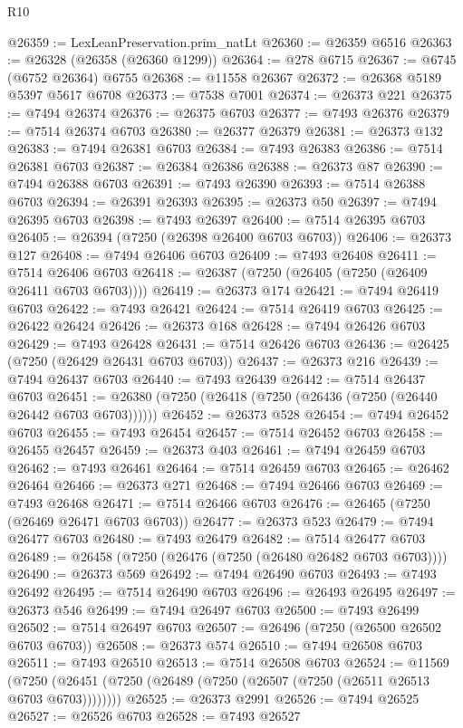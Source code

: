 \begin{lexlean}{R10}
\begin{coremodule}
@26359 := LexLeanPreservation.prim_natLt
@26360 := @26359 @6516
@26363 := @26328 (@26358 (@26360 @1299))
@26364 := @278 @6715
@26367 := @6745 (@6752 @26364) @6755
@26368 := @11558 @26367
@26372 := @26368 @5189 @5397 @5617 @6708
@26373 := @7538 @7001
@26374 := @26373 @221
@26375 := @7494 @26374
@26376 := @26375 @6703
@26377 := @7493 @26376
@26379 := @7514 @26374 @6703
@26380 := @26377 @26379
@26381 := @26373 @132
@26383 := @7494 @26381 @6703
@26384 := @7493 @26383
@26386 := @7514 @26381 @6703
@26387 := @26384 @26386
@26388 := @26373 @87
@26390 := @7494 @26388 @6703
@26391 := @7493 @26390
@26393 := @7514 @26388 @6703
@26394 := @26391 @26393
@26395 := @26373 @50
@26397 := @7494 @26395 @6703
@26398 := @7493 @26397
@26400 := @7514 @26395 @6703
@26405 := @26394 (@7250 (@26398 @26400 @6703 @6703))
@26406 := @26373 @127
@26408 := @7494 @26406 @6703
@26409 := @7493 @26408
@26411 := @7514 @26406 @6703
@26418 := @26387 (@7250 (@26405 (@7250 (@26409 @26411 @6703 @6703))))
@26419 := @26373 @174
@26421 := @7494 @26419 @6703
@26422 := @7493 @26421
@26424 := @7514 @26419 @6703
@26425 := @26422 @26424
@26426 := @26373 @168
@26428 := @7494 @26426 @6703
@26429 := @7493 @26428
@26431 := @7514 @26426 @6703
@26436 := @26425 (@7250 (@26429 @26431 @6703 @6703))
@26437 := @26373 @216
@26439 := @7494 @26437 @6703
@26440 := @7493 @26439
@26442 := @7514 @26437 @6703
@26451 := @26380 (@7250 (@26418 (@7250 (@26436 (@7250 (@26440 @26442 @6703 @6703))))))
@26452 := @26373 @528
@26454 := @7494 @26452 @6703
@26455 := @7493 @26454
@26457 := @7514 @26452 @6703
@26458 := @26455 @26457
@26459 := @26373 @403
@26461 := @7494 @26459 @6703
@26462 := @7493 @26461
@26464 := @7514 @26459 @6703
@26465 := @26462 @26464
@26466 := @26373 @271
@26468 := @7494 @26466 @6703
@26469 := @7493 @26468
@26471 := @7514 @26466 @6703
@26476 := @26465 (@7250 (@26469 @26471 @6703 @6703))
@26477 := @26373 @523
@26479 := @7494 @26477 @6703
@26480 := @7493 @26479
@26482 := @7514 @26477 @6703
@26489 := @26458 (@7250 (@26476 (@7250 (@26480 @26482 @6703 @6703))))
@26490 := @26373 @569
@26492 := @7494 @26490 @6703
@26493 := @7493 @26492
@26495 := @7514 @26490 @6703
@26496 := @26493 @26495
@26497 := @26373 @546
@26499 := @7494 @26497 @6703
@26500 := @7493 @26499
@26502 := @7514 @26497 @6703
@26507 := @26496 (@7250 (@26500 @26502 @6703 @6703))
@26508 := @26373 @574
@26510 := @7494 @26508 @6703
@26511 := @7493 @26510
@26513 := @7514 @26508 @6703
@26524 := @11569
    (@7250 (@26451 (@7250 (@26489 (@7250 (@26507 (@7250 (@26511 @26513 @6703 @6703))))))))
@26525 := @26373 @2991
@26526 := @7494 @26525
@26527 := @26526 @6703
@26528 := @7493 @26527

\end{coremodule}
\end{lexlean}
